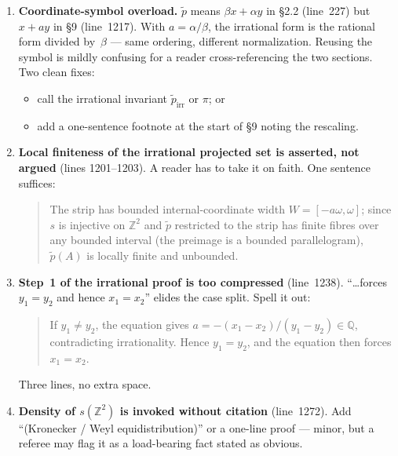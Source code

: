 \documentclass[11pt]{article}
\begin{document}
\begin{enumerate}[label=\textbf{\arabic*.}]
    \item \textbf{Coordinate-symbol overload.}\quad
    \(\tilde p\) means \(\beta x + \alpha y\) in \S2.2 (line~227) but
    \(x + a y\) in \S9 (line~1217).  With \(a=\alpha/\beta\), the
    irrational form is the rational form divided by~\(\beta\) --- same
    ordering, different normalization.  Reusing the symbol is mildly
    confusing for a reader cross-referencing the two sections.  Two clean
    fixes:
    \begin{itemize}
        \item call the irrational invariant \(\tilde p_{\mathrm{irr}}\)
              or \(\pi\); or
        \item add a one-sentence footnote at the start of \S9 noting the
              rescaling.
    \end{itemize}

    \item \textbf{Local finiteness of the irrational projected set is
    asserted, not argued} (lines 1201--1203).  A reader has to take it
    on faith.  One sentence suffices:
    \begin{quote}
    The strip has bounded internal-coordinate width
    \(W=[-a\omega,\omega]\); since \(s\) is injective on \(\mathbb{Z}^2\)
    and \(\tilde p\) restricted to the strip has finite fibres over any
    bounded interval (the preimage is a bounded parallelogram),
    \(\tilde p(A)\) is locally finite and unbounded.
    \end{quote}

    \item \textbf{Step~1 of the irrational proof is too compressed}
    (line~1238).  ``\ldots forces \(y_1=y_2\) and hence \(x_1=x_2\)''
    elides the case split.  Spell it out:
    \begin{quote}
    If \(y_1 \ne y_2\), the equation gives
    \(a = -(x_1-x_2)/(y_1-y_2) \in \mathbb{Q}\), contradicting
    irrationality.  Hence \(y_1=y_2\), and the equation then forces
    \(x_1=x_2\).
    \end{quote}
    Three lines, no extra space.

    \item \textbf{Density of \(s(\mathbb{Z}^2)\) is invoked without
    citation} (line~1272).  Add ``(Kronecker / Weyl equidistribution)''
    or a one-line proof --- minor, but a referee may flag it as a
    load-bearing fact stated as obvious.
\end{enumerate}
\end{document}
